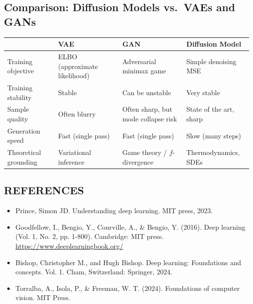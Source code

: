 \documentclass[12pt,a4paper]{article}
\begin{document}
\subsection{Comparison: Diffusion Models vs.\ VAEs and GANs}

\begin{center}
\renewcommand{\arraystretch}{1.3}
\begin{tabular}{|l|p{3.2cm}|p{3.2cm}|p{3.8cm}|}
\hline
& \textbf{VAE} & \textbf{GAN} & \textbf{Diffusion Model} \\
\hline
Training objective & ELBO (approximate likelihood) & Adversarial minimax game & Simple denoising MSE \\
Training stability & Stable & Can be unstable & Very stable \\
Sample quality & Often blurry & Often sharp, but mode collapse risk & State of the art, sharp \\
Generation speed & Fast (single pass) & Fast (single pass) & Slow (many steps) \\
Theoretical grounding & Variational inference & Game theory / $f$-divergence & Thermodynamics, SDEs \\
\hline
\end{tabular}
\end{center}

\subsection*{REFERENCES}
\begin{itemize}
    \item Prince, Simon JD. Understanding deep learning. MIT press, 2023.
    \item Goodfellow, I., Bengio, Y., Courville, A., \& Bengio, Y. (2016). Deep learning (Vol. 1, No. 2, pp. 1-800). Cambridge: MIT press. \url{https://www.deeplearningbook.org/}
    \item Bishop, Christopher M., and Hugh Bishop. Deep learning: Foundations and concepts. Vol. 1. Cham, Switzerland: Springer, 2024.
    \item Torralba, A., Isola, P., \& Freeman, W. T. (2024). Foundations of computer vision. MIT Press.
\end{itemize}
\end{document}

